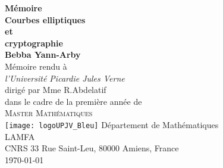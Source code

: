 \begin{titlepage}
\begin{center}
  {\huge\bfseries Mémoire \\[1ex] 
                  Courbes elliptiques \\
              et \\ [1ex]
          cryptographie}                  \\[6.5ex]
  {\large\bfseries Bebba Yann-Arby}           \\
  \vspace{4ex}
  Mémoire rendu à                    \\[5pt]
  \textit{l'Université Picardie Jules Verne}                \\[1ex]
  dirigé par Mme R.Abdelatif \\ [2cm]
  dans le cadre de la première année de  \\[1ex]
  \textsc{\Large Master Mathématiques}    \\[6ex]
  \texttt{[image: logoUPJV\_Bleu]}
  \vfill
  Département de Mathématiques               \\
  LAMFA \\
  CNRS 33 Rue Saint-Leu, 80000 Amiens, France                                 \\
  \today \\
  \vfill
\end{center}
\end{titlepage}
